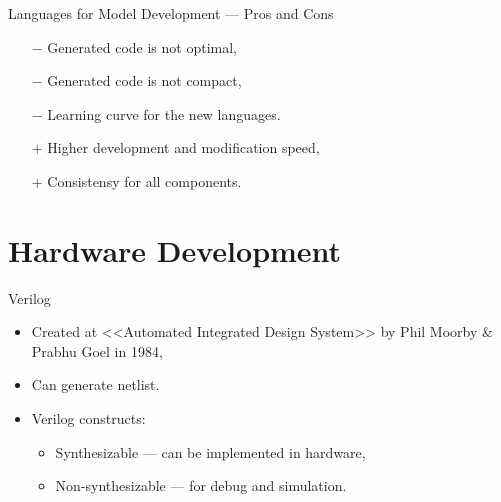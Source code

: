 
\begin{frame}{Languages for Model Development --- Pros and Cons}
  \begin{itemize}
    \item[$-$] Generated code is not optimal,
    \item[$-$] Generated code is not compact,
    \item[$-$] Learning curve for the new languages.
    \item[$+$] Higher development and modification speed,
    \item[$+$] Consistensy for all components.
  \end{itemize}
\end{frame}

\section{Hardware Development}


\begin{frame}{Verilog}
  \begin{itemize}
    \item Created at <<Automated Integrated Design System>> by Phil Moorby \&
      Prabhu Goel in 1984,
    \item Can generate netlist.
    \item Verilog constructs:
    \begin{itemize}
      \item Synthesizable --- can be implemented in hardware,
      \item Non-synthesizable --- for debug and simulation.
    \end{itemize}
  \end{itemize}
\end{frame}


